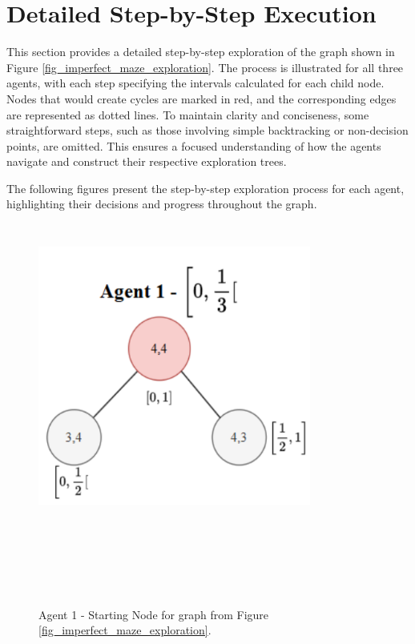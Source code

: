 \section{Detailed Step-by-Step Execution}
\label{section_appendix_step_by_step}

This section provides a detailed step-by-step exploration of the graph shown in Figure \ref{fig_imperfect_maze_exploration}. The process is illustrated for all three agents, with each step specifying the intervals calculated for each child node. Nodes that would create cycles are marked in red, and the corresponding edges are represented as dotted lines. To maintain clarity and conciseness, some straightforward steps, such as those involving simple backtracking or non-decision points, are omitted. This ensures a focused understanding of how the agents navigate and construct their respective exploration trees.

The following figures present the step-by-step exploration process for each agent, highlighting their decisions and progress throughout the graph.

\begin{figure}[H]
    \centering
    \includegraphics[width=0.8\textwidth]{ApeA/maze_agent_1_step_0.png}
    \caption{Agent 1 - Starting Node for graph from Figure \ref{fig_imperfect_maze_exploration}.}
    \label{fig_agent_1_step_0}
\end{figure}

